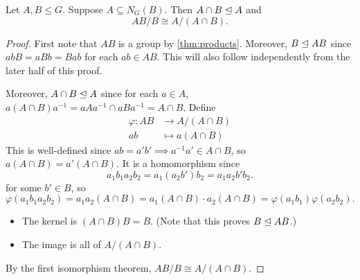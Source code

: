 \begin{theorem*} \label{thm:iso:2}
    Let $A, B \le G$.
    Suppose $A \subseteq N_G(B)$.
    Then $A \cap B \trianglelefteq A$ and \[
        AB/B \cong A/(A \cap B).
    \]
\end{theorem*}
\begin{proof}
    First note that $AB$ is a group by \cref{thm:products}.
    Moreover, $B \trianglelefteq AB$ since $abB = aBb = Bab$ for each $ab \in AB$.
    This will also follow independently from the later half of this proof.

    Moreover, $A \cap B \trianglelefteq A$ since for each $a \in A$,
    $a(A \cap B)a^{-1} = aAa^{-1} \cap aBa^{-1} = A \cap B$.
    Define \begin{align*}
        \varphi\colon AB &\to A/(A \cap B) \\
        ab &\mapsto a(A \cap B)
    \end{align*}
    This is well-defined since $ab = a'b' \implies a^{-1}a' \in A \cap B$,
    so $a(A \cap B) = a'(A \cap B)$.
    It is a homomorphism since \[
        a_1b_1a_2b_2 = a_1(a_2b')b_2 = a_1 a_2 b' b_2.
    \] for some $b' \in B$, so \[
        \varphi(a_1b_1 a_2b_2) = a_1a_2 (A \cap B)
        = a_1(A \cap B) \cdot a_2(A \cap B)
        = \varphi(a_1b_1) \varphi(a_2b_2).
    \]
    \begin{itemize}
        \item The kernel is $(A \cap B) B = B$.
        (Note that this proves $B \trianglelefteq AB$.)
        \item The image is all of $A/(A \cap B)$.
    \end{itemize}
    By the first isomorphism theorem, $AB/B \cong A/(A \cap B)$.
\end{proof}
